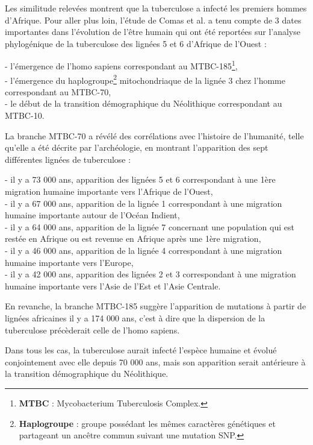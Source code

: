 \documentclass[twoside,a4paper,11pt,frenchb,openany]{report}
\begin{document}

Les similitude relevées montrent que la tuberculose a infecté les premiers hommes d'Afrique. Pour aller plus loin, l'étude de Comas et al. a tenu compte de 3 dates importantes dans l'évolution de l'être humain qui ont été reportées sur l'analyse phylogénique de la tuberculose des lignées 5 et 6 d'Afrique de l'Ouest :

- l'émergence de l'homo sapiens correspondant au MTBC-185\footnote{\textbf{MTBC} : Mycobacterium Tuberculosis Complex.},\\
- l'émergence du haplogroupe\footnote{\textbf{Haplogroupe} : groupe possédant les mêmes caractères génétiques et partageant un ancêtre commun suivant une mutation SNP.} mitochondriaque de la lignée 3 chez l'homme correspondant au MTBC-70,\\
- le début de la transition démographique du Néolithique correspondant au MTBC-10.

La branche MTBC-70 a révélé des corrélations avec l'histoire de l'humanité, telle qu'elle a été décrite par l'archéologie, en montrant l'apparition des sept différentes lignées de tuberculose :

- il y a 73 000 ans, apparition des lignées 5 et 6 correspondant à une 1ère migration humaine importante vers l'Afrique de l'Ouest,\\
- il y a 67 000 ans, apparition de la lignée 1 correspondant à une migration humaine importante autour de l'Océan Indient,\\
- il y a 64 000 ans, apparition de la lignée 7 concernant une population qui est restée en Afrique ou est revenue en Afrique après une 1ère migration,\\
- il y a 46 000 ans, apparition de la lignée 4 correspondant à une migration humaine importante vers l'Europe,\\
- il y a 42 000 ans, apparition des lignées 2 et 3 correspondant à une migration humaine importante vers l'Asie de l'Est et l'Asie Centrale. 

En revanche, la branche MTBC-185 suggère l'apparition de mutations à partir de lignées africaines il y a 174 000 ans, c'est à dire que la dispersion de la tuberculose précèderait celle de l'homo sapiens.


Dans tous les cas, la tuberculose aurait infecté l'espèce humaine et évolué conjointement avec elle depuis 70 000 ans, mais son apparition serait antérieure à la transition démographique du Néolithique.
\end{document}
